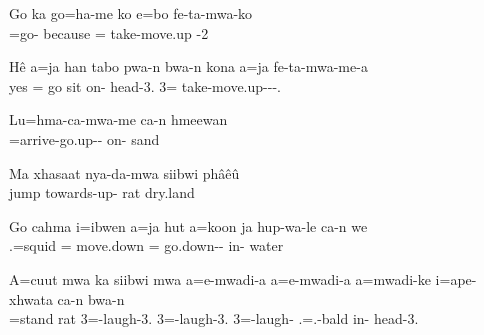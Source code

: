 \z
\ea%
\gll Go ka go=ha-me ko e=bo fe-ta-mwa-ko\\   =go- because = take-move.up -2\\ \glt {}

\z
\ea%

\gll Hê a=ja han tabo pwa-n bwa-n kona a=ja fe-ta-mwa-me-a\\ yes = go sit on- head-3.  3= take-move.up---.\\ \glt {}

\z
\ea%

\gll Lu=hma-ca-mwa-me ca-n hmeewan\\ =arrive-go.up-- on- sand\\ \glt {}

\z
\ea%

\gll Ma xhasaat nya-da-mwa siibwi phâêû\\  jump towards-up- rat dry.land\\ \glt {}

\z
\ea%

\gll Go cahma i=ibwen a=ja hut a=koon ja hup-wa-le ca-n we\\   .=squid = move.down =  go.down-- in- water\\ \glt {}
\z
\pagebreak
\ea%

\gll A=cuut mwa ka siibwi mwa a=e-mwadi-a a=e-mwadi-a a=mwadi-ke i=ape-xhwata ca-n bwa-n\\ =stand   rat  3=-laugh-3. 3=-laugh-3. 3=-laugh- .=.-bald in- head-3.\\ \glt {}

